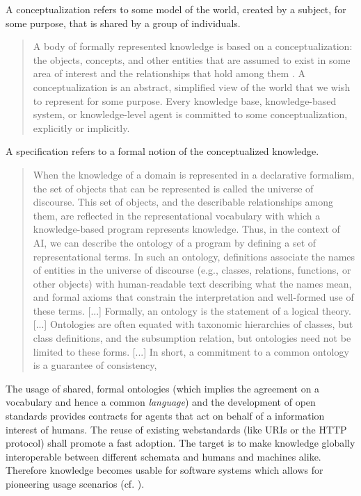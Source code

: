 A conceptualization refers to some model of the world, created by a subject, for some purpose, that is shared by a group of individuals.
\begin{quote}
A body of formally represented knowledge is based on a conceptualization: the objects, concepts, and other entities that are assumed to exist in some area of interest and the relationships that hold among them \cite{genesereth}. 
A conceptualization is an abstract, simplified view of the world that we wish to represent for some purpose. 
Every knowledge base, knowledge-based system, or knowledge-level agent is committed to some conceptualization, explicitly or implicitly. \cite{gruber}
\end{quote}
A specification refers to a formal notion of the conceptualized knowledge.
\begin{quote}
When the knowledge of a domain is represented in a declarative formalism, the set of objects that can be represented is called the universe of discourse. 
This set of objects, and the describable relationships among them, are reflected in the representational vocabulary with which a knowledge-based program represents knowledge. 
Thus, in the context of AI, we can describe the ontology of a program by defining a set of representational terms. 
In such an ontology, definitions associate the names of entities in the universe of discourse (e.g., classes, relations, functions, or other objects) with human-readable text describing what the names mean, and formal axioms that constrain the interpretation and well-formed use of these terms. 
[...]
Formally, an ontology is the statement of a logical theory. 
[...]
Ontologies are often equated with taxonomic hierarchies of classes, but class definitions, and the subsumption relation, but ontologies need not be limited to these forms.
[...]
In short, a commitment to a common ontology is a guarantee of consistency,
\cite{gruber}
\end{quote}

The usage of shared, formal ontologies (which implies the agreement on a vocabulary and hence a common \textit{language}) and the development of open standards provides contracts for agents that act on behalf of a information interest of humans. 
The reuse of existing webstandards (like URIs or the HTTP protocol) shall promote a fast adoption. 
The target is to make knowledge globally interoperable between different schemata and humans and machines alike. 
Therefore knowledge becomes usable for software systems which allows for pioneering usage scenarios (cf. \cite{hitzler}).\\

